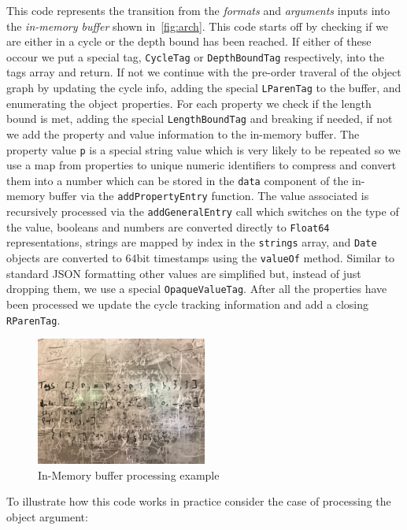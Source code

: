 This code represents the transition from the \emph{formats} and \emph{arguments} 
inputs into the \emph{in-memory buffer} shown in~\autoref{fig:arch}. This code 
starts off by checking if we are either in a cycle or the depth bound has been 
reached. If either of these occour we put a special tag, \texttt{CycleTag} or 
\texttt{DepthBoundTag} respectively, into the tags array and return. If not we 
continue with the pre-order traveral of the object graph by updating the cycle 
info, adding the special \texttt{LParenTag} to the buffer, and enumerating the 
object properties. For each property we check if the length bound is met, adding 
the special \texttt{LengthBoundTag} and breaking if needed, if not we add the 
property and value information to the in-memory buffer. The property value \texttt{p} 
is a special string value which is very likely to be repeated so we use a map 
from properties to unique numeric identifiers to compress and convert them into 
a number which can be stored in the \texttt{data} component of the in-memory buffer 
via the \texttt{addPropertyEntry} function. The value associated is recursively 
processed via the \texttt{addGeneralEntry} call which switches on the type of the 
value, booleans and numbers are converted directly to \texttt{Float64} representations, 
strings are mapped by index in the \texttt{strings} array, and \texttt{Date} objects 
are converted to $64$bit timestamps using the \texttt{valueOf} method. Similar to 
standard JSON formatting other values are simplified but, instead of just dropping 
them, we use a special \texttt{OpaqueValueTag}. After all the properties have 
been processed we update the cycle tracking information and add a closing 
\texttt{RParenTag}.

\begin{figure}
    \centering
    \includegraphics[width=0.5\textwidth]{Figures/InMemoryExample}
    \caption{In-Memory buffer processing example}
    \label{fig:inmemory}
\end{figure}

To illustrate how this code works in practice consider the case of processing the 
object argument:

